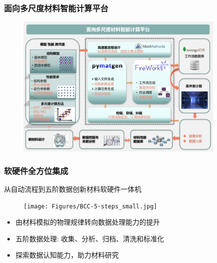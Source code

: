 %
\begin{frame}
	\frametitle{面向多尺度材料智能计算平台}
\begin{figure}[h!]
\centering
\includegraphics[height=2.75in]{Figures/MP_comp_BCC-2.png}
\label{MP_comp_BCC_2}
\end{figure}
\end{frame}

\begin{frame}
	\frametitle{软硬件全方位集成}
	从自动流程到五阶数据创新材料软硬件一体机
\begin{figure}[h!]
\centering
\texttt{[image: Figures/BCC-5-steps\_small.jpg]}
\label{BCC-5-steps}
\end{figure}
\begin{itemize}
	\item 由材料模拟的物理规律转向数据处理能力的提升
	\item 五阶数据处理: 收集、分析、归档、清洗和标准化
	\item 探索数据认知能力，助力材料研究
\end{itemize}
\end{frame}

